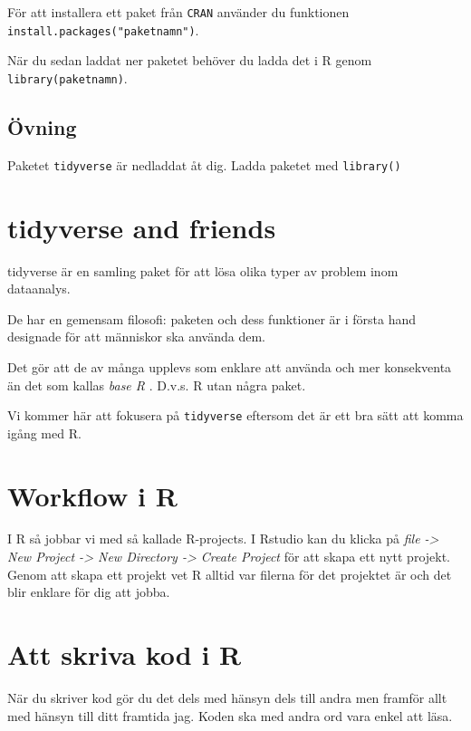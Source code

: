 \documentclass[
]{book}
\begin{document}
För att installera ett paket från \texttt{CRAN} använder du funktionen \texttt{install.packages("paketnamn")}.

När du sedan laddat ner paketet behöver du ladda det i R genom \texttt{library(paketnamn)}.

\hypertarget{uxf6vning-1}{%
\subsection{Övning}\label{uxf6vning-1}}

Paketet \texttt{tidyverse} är nedladdat åt dig. Ladda paketet med \texttt{library()}

\hypertarget{tidyverse-and-friends}{%
\section{tidyverse and friends}\label{tidyverse-and-friends}}

tidyverse är en samling paket för att lösa olika typer av problem inom dataanalys.

De har en gemensam filosofi: paketen och dess funktioner är i första hand designade för att människor ska använda dem.

Det gör att de av många upplevs som enklare att använda och mer konsekventa än det som kallas \emph{base R} . D.v.s. R utan några paket.

Vi kommer här att fokusera på \texttt{tidyverse} eftersom det är ett bra sätt att komma igång med R.

\hypertarget{workflow-i-r}{%
\section{Workflow i R}\label{workflow-i-r}}

I R så jobbar vi med så kallade R-projects. I Rstudio kan du klicka på \emph{file -\textgreater{} New Project -\textgreater{} New Directory -\textgreater{} Create Project} för att skapa ett nytt projekt. Genom att skapa ett projekt vet R alltid var filerna för det projektet är och det blir enklare för dig att jobba.

\hypertarget{att-skriva-kod-i-r}{%
\section{Att skriva kod i R}\label{att-skriva-kod-i-r}}

När du skriver kod gör du det dels med hänsyn dels till andra men framför allt med hänsyn till ditt framtida jag. Koden ska med andra ord vara enkel att läsa.
\end{document}
